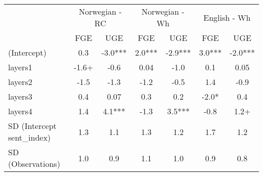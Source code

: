\begin{longtable}{lcccccc}
\toprule
 & \multicolumn{2}{c}{Norwegian - RC} & \multicolumn{2}{c}{Norwegian - Wh} & \multicolumn{2}{c}{English - Wh} \\ 
\cmidrule(lr){2-3} \cmidrule(lr){4-5} \cmidrule(lr){6-7}
  & FGE & UGE & FGE & UGE & FGE & UGE \\ 
\midrule\addlinespace[2.5pt]
(Intercept) & 0.3 & -3.0*** & 2.0*** & -2.9*** & 3.0*** & -2.0*** \\ 
layers1 & -1.6+ & -0.6 & 0.04 & -1.0 & 0.1 & 0.05 \\ 
layers2 & -1.5 & -1.3 & -1.2 & -0.5 & 1.4 & -0.9 \\ 
layers3 & 0.4 & 0.07 & 0.3 & 0.2 & -2.0* & 0.4 \\ 
layers4 & 1.4 & 4.1*** & -1.3 & 3.5*** & -0.8 & 1.2+ \\ 
SD (Intercept sent\_index) & 1.3 & 1.1 & 1.3 & 1.2 & 1.7 & 1.2 \\ 
SD (Observations) & 1.0 & 0.9 & 1.1 & 1.0 & 0.9 & 0.8 \\ 
\bottomrule
\end{longtable}


